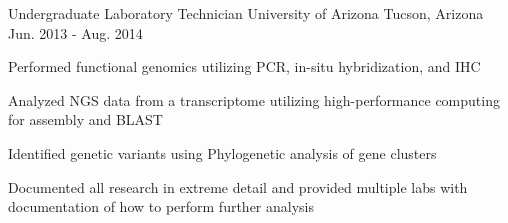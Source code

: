 \begin{cventries}
  \cventry
  {Undergraduate Laboratory Technician} %
  {University of Arizona} %
  {Tucson, Arizona} %
  {Jun. 2013 - Aug. 2014} %
  {
    \begin{cvitems} %
      \item{Performed functional genomics utilizing PCR, in-situ hybridization, and IHC}
      \item{Analyzed NGS data from a transcriptome utilizing high-performance computing for assembly and BLAST}
      \item{Identified genetic variants using Phylogenetic analysis of gene clusters}
      \item{Documented all research in extreme detail and provided multiple labs with documentation of how to perform further analysis}
    \end{cvitems}
  }
\end{cventries}
